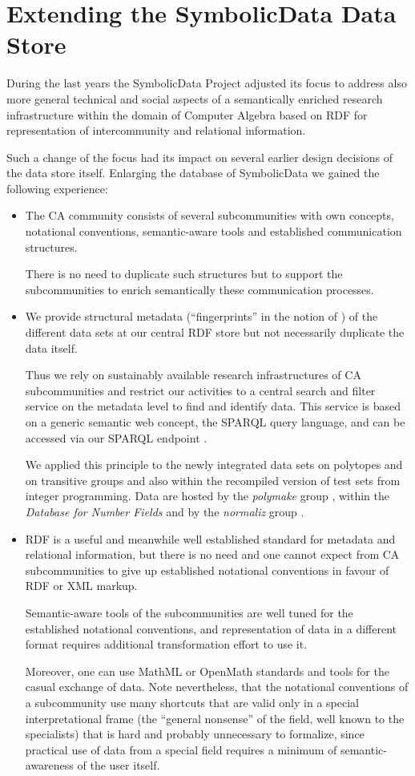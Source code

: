 \documentclass{llncs}
\newcommand{\SD}{{\sc Symbo\-lic\-Data}}
\begin{document}
\section{Extending the {\SD} Data Store}

During the last years the {\SD} Project adjusted its focus to address also
more general technical and social aspects of a semantically enriched research
infrastructure within the domain of Computer Algebra based on RDF for
representation of intercommunity and relational information.

Such a change of the focus had its impact on several earlier design decisions
of the data store itself. Enlarging the database of {\SD} we gained the
following experience:
\begin{itemize}
\item The CA community consists of several subcommunities with own concepts,
  notational conventions, semantic-aware tools and established communication
  structures.  

  There is no need to duplicate such structures but to support the
  subcommunities to enrich semantically these communication processes.
\item We provide structural metadata (``fingerprints'' in the notion of
  \cite{cicm-14}) of the different data sets at our central RDF store
  \cite{sdstore} but not necessarily duplicate the data itself. 

  Thus we rely on sustainably available research infrastructures of CA
  subcommunities and restrict our activities to a central search and filter
  service on the metadata level to find and identify data. This service is
  based on a generic semantic web concept, the SPARQL query language, and can
  be accessed via our SPARQL endpoint \cite{sdsparql}.

  We applied this principle to the newly integrated data sets on polytopes and
  on transitive groups and also within the recompiled version of test sets from
  integer programming.  Data are hosted by the \emph{polymake} group
  \cite{polymake}, within the \emph{Database for Number Fields}
  \cite{MalleKlueners} and by the \emph{normaliz} group \cite{normaliz}.
\item RDF is a useful and meanwhile well established standard for metadata and
  relational information, but there is no need and one cannot expect from CA
  subcommunities to give up established notational conventions in favour of
  RDF or XML markup. 

  Semantic-aware tools of the subcommunities are well tuned for the
  established notational conventions, and representation of data in a different
  format requires additional transformation effort to use it.

  Moreover, one can use MathML or OpenMath standards and tools for the casual
  exchange of data. Note nevertheless, that the notational conventions of a
  subcommunity use many shortcuts that are valid only in a special
  interpretational frame (the ``general nonsense'' of the field, well known to
  the specialists) that is hard and probably unnecessary to formalize, since
  practical use of data from a special field requires a minimum of
  semantic-awareness of the user itself.
\end{itemize}
\end{document}
